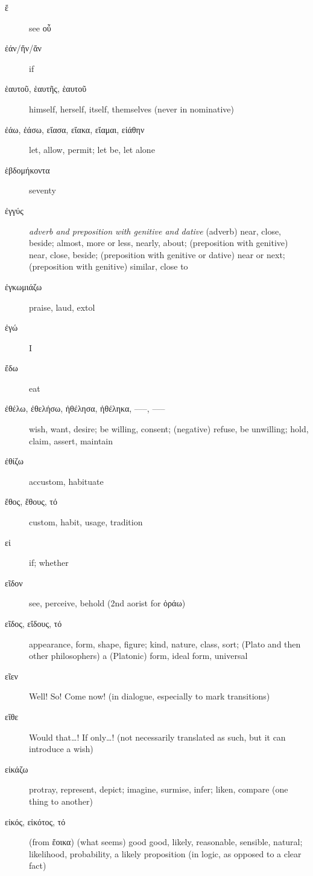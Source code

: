 \documentclass[12pt,letterpaper]{article}
\begin{document}
\begin{description}
    \item[\textgreek{ἕ}] \marginnote{*}see \textgreek{οὗ}
    \item[\textgreek{ἐάν/ἤν/ἄν}] \marginnote{*}if
    \item[\textgreek{ἑαυτοῦ, ἑαυτῆς, ἑαυτοῦ}] \marginnote{*}himself, herself, itself, themselves (never in nominative)
    \item[\textgreek{ἐάω, ἐάσω, εἴασα, εἴακα, εἴαμαι, εἰάθην}] \marginnote{*}let, allow, permit; let be, let alone
    \item[\textgreek{ἑβδομήκοντα}] seventy
    \item[\textgreek{ἐγγύς}] \textit{adverb and preposition with genitive and dative} (adverb) near, close, beside; almost, more or less, nearly, about; (preposition with genitive) near, close, beside; (preposition with genitive or dative) near or next; (preposition with genitive) similar, close to
    \item[\textgreek{ἐγκωμιάζω}] praise, laud, extol
    \item[\textgreek{ἐγώ}] \marginnote{*}I
    \item[\textgreek{ἔδω}] eat
    \item[\textgreek{ἐθέλω, ἐθελήσω, ἠθέλησα, ἠθέληκα, –––, –––}] \marginnote{*}wish, want, desire; be willing, consent; (negative) refuse, be unwilling; hold, claim, assert, maintain
    \item[\textgreek{ἐθίζω}] accustom, habituate
    \item[\textgreek{ἔθος, ἔθους, τό}] custom, habit, usage, tradition
    \item[\textgreek{εἰ}] \marginnote{*}if; whether
    \item[\textgreek{εῖδον}] \marginnote{*}see, perceive, behold (2nd aorist for \textgreek{ὁράω})
    \item[\textgreek{εῖδος, εἴδους, τό}] appearance, form, shape, figure; kind, nature, class, sort; (Plato and then other philosophers) a (Platonic) form, ideal form, universal
    \item[\textgreek{εῖεν}] Well! So! Come now! (in dialogue, especially to mark transitions)
    \item[\textgreek{εἴθε}] Would that\dots ! If only\dots ! (not necessarily translated as such, but it can introduce a wish)
    \item[\textgreek{εἰκάζω}] protray, represent, depict; imagine, surmise, infer; liken, compare (one thing to another)
    \item[\textgreek{εἰκός, εἰκότος, τό}] \marginnote{*}(from \textgreek{ἔοικα}) (what seems) good good, likely, reasonable, sensible, natural; likelihood, probability, a likely proposition (in logic, as opposed to a clear fact)

\end{description}
\end{document}
